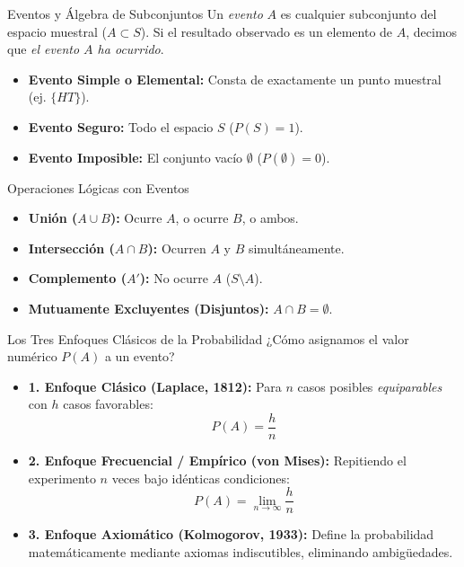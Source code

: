 \begin{frame}{Eventos y Álgebra de Subconjuntos}
  \small Un \emph{evento} $A$ es cualquier subconjunto del espacio muestral ($A \subset S$). Si el resultado observado es un elemento de $A$, decimos que \emph{el evento $A$ ha ocurrido}. \pause

  \vspace{0.1em}
  \begin{itemize}\itemsep=0.1em
    \item \textbf{Evento Simple o Elemental:} Consta de exactamente un punto muestral (ej. $\{HT\}$). \pause
    \item \textbf{Evento Seguro:} Todo el espacio $S$ ($P(S) = 1$). \pause
    \item \textbf{Evento Imposible:} El conjunto vacío $\emptyset$ ($P(\emptyset) = 0$).
  \end{itemize}

  \vspace{0.1em}
  \pause
  \begin{block}{Operaciones Lógicas con Eventos}
    \begin{itemize}\itemsep=0.1em
      \item \textbf{Unión ($A \cup B$):} Ocurre $A$, o ocurre $B$, o ambos.
      \item \textbf{Intersección ($A \cap B$):} Ocurren $A$ y $B$ simultáneamente.
      \item \textbf{Complemento ($A'$):} No ocurre $A$ ($S \setminus A$).
      \item \textbf{Mutuamente Excluyentes (Disjuntos):} $A \cap B = \emptyset$.
    \end{itemize}
  \end{block}
\end{frame}

\begin{frame}{Los Tres Enfoques Clásicos de la Probabilidad}
  \footnotesize ¿Cómo asignamos el valor numérico $P(A)$ a un evento? \pause

  \vspace{0.1em}
  \begin{itemize}\itemsep=0.2em
    \item \textbf{1. Enfoque Clásico (Laplace, 1812):} Para $n$ casos posibles \emph{equiparables} con $h$ casos favorables:
    $$P(A) = \frac{h}{n}$$ \pause
    \item \textbf{2. Enfoque Frecuencial / Empírico (von Mises):} Repitiendo el experimento $n$ veces bajo idénticas condiciones:
    $$P(A) = \lim_{n \to \infty} \frac{h}{n}$$ \pause
    \item \textbf{3. Enfoque Axiomático (Kolmogorov, 1933):} Define la probabilidad matemáticamente mediante axiomas indiscutibles, eliminando ambigüedades.
  \end{itemize}
\end{frame}


